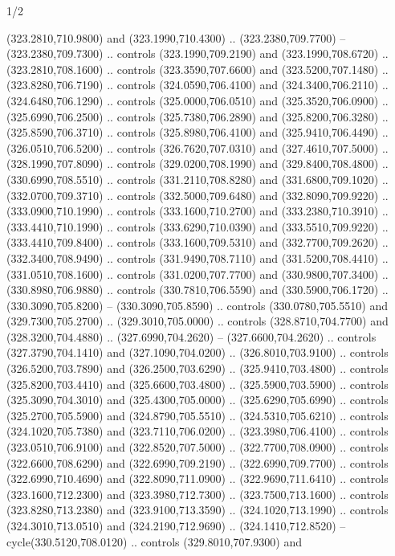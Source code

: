 \begin{flagdescription}{1/2}
\begin{scope}[xshift=0.5\flaglength]
\begin{scope}[scale=0.00745\flagwidth,xshift=-12.1mm,yshift=41.7mm]
\begin{scope}[y=0.80pt, x=0.80pt, yscale=-1, xscale=1, inner sep=0pt, outer sep=0pt]
\begin{scope}[cm={{1.33333,0.0,0.0,-1.33333,(0.0,114.66667)}}]
\begin{scope}[scale=0.100]
  (323.2810,710.9800) and (323.1990,710.4300) .. (323.2380,709.7700) --
  (323.2380,709.7300) .. controls (323.1990,709.2190) and (323.1990,708.6720) ..
  (323.2810,708.1600) .. controls (323.3590,707.6600) and (323.5200,707.1480) ..
  (323.8280,706.7190) .. controls (324.0590,706.4100) and (324.3400,706.2110) ..
  (324.6480,706.1290) .. controls (325.0000,706.0510) and (325.3520,706.0900) ..
  (325.6990,706.2500) .. controls (325.7380,706.2890) and (325.8200,706.3280) ..
  (325.8590,706.3710) .. controls (325.8980,706.4100) and (325.9410,706.4490) ..
  (326.0510,706.5200) .. controls (326.7620,707.0310) and (327.4610,707.5000) ..
  (328.1990,707.8090) .. controls (329.0200,708.1990) and (329.8400,708.4800) ..
  (330.6990,708.5510) .. controls (331.2110,708.8280) and (331.6800,709.1020) ..
  (332.0700,709.3710) .. controls (332.5000,709.6480) and (332.8090,709.9220) ..
  (333.0900,710.1990) .. controls (333.1600,710.2700) and (333.2380,710.3910) ..
  (333.4410,710.1990) .. controls (333.6290,710.0390) and (333.5510,709.9220) ..
  (333.4410,709.8400) .. controls (333.1600,709.5310) and (332.7700,709.2620) ..
  (332.3400,708.9490) .. controls (331.9490,708.7110) and (331.5200,708.4410) ..
  (331.0510,708.1600) .. controls (331.0200,707.7700) and (330.9800,707.3400) ..
  (330.8980,706.9880) .. controls (330.7810,706.5590) and (330.5900,706.1720) ..
  (330.3090,705.8200) -- (330.3090,705.8590) .. controls (330.0780,705.5510) and
  (329.7300,705.2700) .. (329.3010,705.0000) .. controls (328.8710,704.7700) and
  (328.3200,704.4880) .. (327.6990,704.2620) -- (327.6600,704.2620) .. controls
  (327.3790,704.1410) and (327.1090,704.0200) .. (326.8010,703.9100) .. controls
  (326.5200,703.7890) and (326.2500,703.6290) .. (325.9410,703.4800) .. controls
  (325.8200,703.4410) and (325.6600,703.4800) .. (325.5900,703.5900) .. controls
  (325.3090,704.3010) and (325.4300,705.0000) .. (325.6290,705.6990) .. controls
  (325.2700,705.5900) and (324.8790,705.5510) .. (324.5310,705.6210) .. controls
  (324.1020,705.7380) and (323.7110,706.0200) .. (323.3980,706.4100) .. controls
  (323.0510,706.9100) and (322.8520,707.5000) .. (322.7700,708.0900) .. controls
  (322.6600,708.6290) and (322.6990,709.2190) .. (322.6990,709.7700) .. controls
  (322.6990,710.4690) and (322.8090,711.0900) .. (322.9690,711.6410) .. controls
  (323.1600,712.2300) and (323.3980,712.7300) .. (323.7500,713.1600) .. controls
  (323.8280,713.2380) and (323.9100,713.3590) .. (324.1020,713.1990) .. controls
  (324.3010,713.0510) and (324.2190,712.9690) .. (324.1410,712.8520) --
  cycle(330.5120,708.0120) .. controls (329.8010,707.9300) and

\end{scope}
\end{scope}
\end{scope}
\end{scope}
\end{scope}
\end{flagdescription}

